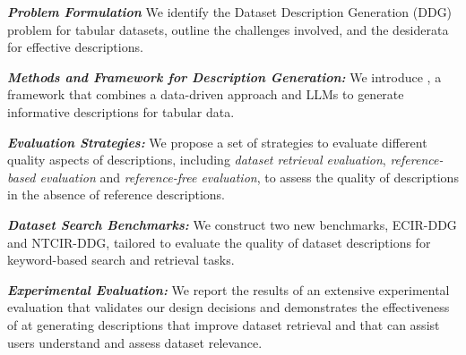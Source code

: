 \noindent\textit{\textbf{Problem Formulation}} We identify the Dataset Description Generation (DDG) problem for tabular datasets, outline the challenges involved, and the desiderata for effective descriptions.

\noindent\textit{\textbf{Methods and Framework for Description Generation:}} We introduce \SystemName, a framework that combines a data-driven approach and LLMs to generate informative descriptions for tabular data.


\noindent\textit{\textbf{Evaluation Strategies:}} We propose a set of strategies to evaluate different quality aspects of descriptions, including  \textit{dataset retrieval evaluation}, \textit{reference-based evaluation} and \textit{reference-free evaluation}, to assess the quality of descriptions in the absence of reference descriptions.

\noindent\textit{\textbf{Dataset Search Benchmarks:}} We construct two new benchmarks, ECIR-DDG and NTCIR-DDG, tailored to evaluate the quality of dataset descriptions for keyword-based search and retrieval tasks.

\noindent\textit{\textbf{Experimental Evaluation:}} We report the results of an extensive experimental evaluation that validates our design decisions and demonstrates the effectiveness
of \SystemName at generating descriptions that improve dataset retrieval and that can assist users understand and assess dataset relevance.   





